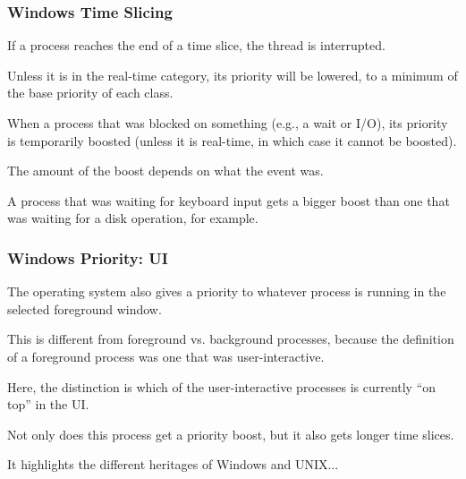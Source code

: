 \begin{frame}
\frametitle{Windows Time Slicing}

If a process reaches the end of a time slice, the thread is interrupted.

Unless it is in the real-time category, its priority will be lowered, to a minimum of the base priority of each class. 

When a process that was blocked on something (e.g., a wait or I/O), its priority is temporarily boosted (unless it is real-time, in which case it cannot be boosted). 

The amount of the boost depends on what the event was.

A process that was waiting for keyboard input gets a bigger boost than one that was waiting for a disk operation, for example.

\end{frame}

\begin{frame}
\frametitle{Windows Priority: UI}

The operating system also gives a priority to whatever process is running in the selected foreground window. 

This is different from foreground vs. background processes, because the definition of a foreground process was one that was user-interactive. 

Here, the distinction is which of the user-interactive processes is currently ``on top'' in the UI. 

Not only does this process get a priority boost, but it also gets longer time slices. 

It highlights the different heritages of Windows and UNIX...

\end{frame}





